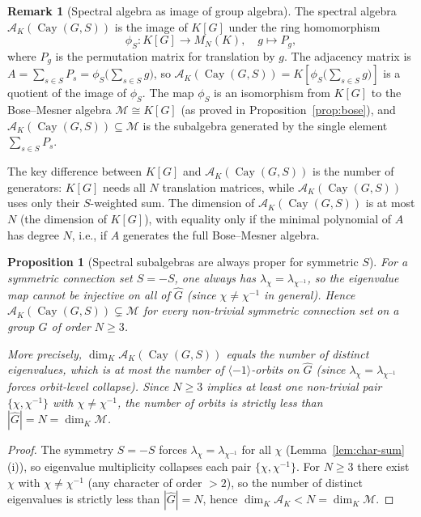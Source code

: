 \documentclass[12pt]{amsart}
\numberwithin{equation}{section}
\theoremstyle{plain}
\newtheorem{proposition}[theorem]{Proposition}
\theoremstyle{definition}
\newtheorem{remark}[theorem]{Remark}
\DeclareMathOperator{\Cay}{Cay}
\newcommand{\calA}{\mathcal{A}}
\newcommand{\Ghat}{\widehat{G}}
\begin{document}
\begin{remark}[Spectral algebra as image of group algebra]
The spectral algebra $\calA_K(\Cay(G,S))$ is the image
of $K[G]$ under the ring homomorphism
\[
  \phi_S : K[G] \to M_N(K), \quad g \mapsto P_g,
\]
where $P_g$ is the permutation matrix for translation by $g$.  The
adjacency matrix is $A = \sum_{s \in S} P_s = \phi_S\!\bigl(\sum_{s \in S} g\bigr)$,
so $\calA_K(\Cay(G,S)) = K\!\left[\phi_S\!\bigl(\sum_{s\in S} g\bigr)\right]$
is a quotient of the image of $\phi_S$.  The map $\phi_S$ is an
isomorphism from $K[G]$ to the Bose--Mesner algebra
$\mathcal{M} \cong K[G]$ (as proved in Proposition~\ref{prop:bose}),
and $\calA_K(\Cay(G,S)) \subseteq \mathcal{M}$ is the subalgebra
generated by the single element $\sum_{s \in S} P_s$.
\end{remark}

The key difference between $K[G]$ and $\calA_K(\Cay(G,S))$ is the
number of generators: $K[G]$ needs all $N$ translation matrices, while
$\calA_K(\Cay(G,S))$ uses only their $S$-weighted sum.  The dimension of
$\calA_K(\Cay(G,S))$ is at most $N$ (the dimension of $K[G]$), with
equality only if the minimal polynomial of $A$ has degree $N$, i.e., if
$A$ generates the full Bose--Mesner algebra.

\begin{proposition}[Spectral subalgebras are always proper for symmetric $S$]
\label{prop:full}
For a symmetric connection set $S = -S$, one always has
$\lambda_\chi = \lambda_{\chi^{-1}}$, so the eigenvalue map cannot be
injective on all of $\Ghat$ (since $\chi \ne \chi^{-1}$ in general).
Hence $\calA_K(\Cay(G,S)) \subsetneq \mathcal{M}$ for every non-trivial
symmetric connection set on a group $G$ of order $N \ge 3$.

More precisely, $\dim_K \calA_K(\Cay(G,S))$ equals the number of distinct
eigenvalues, which is at most the number of $\langle -1 \rangle$-orbits on
$\Ghat$ (since $\lambda_\chi = \lambda_{\chi^{-1}}$ forces orbit-level
collapse).  Since $N \ge 3$ implies at least one non-trivial pair
$\{\chi, \chi^{-1}\}$ with $\chi \ne \chi^{-1}$, the number of orbits
is strictly less than $|\Ghat| = N = \dim_K \mathcal{M}$.
\end{proposition}

\begin{proof}
The symmetry $S = -S$ forces $\lambda_\chi = \lambda_{\chi^{-1}}$ for
all $\chi$ (Lemma~\ref{lem:char-sum}(i)), so eigenvalue multiplicity
collapses each pair $\{\chi, \chi^{-1}\}$.  For $N \ge 3$ there exist
$\chi$ with $\chi \ne \chi^{-1}$ (any character of order $> 2$), so the
number of distinct eigenvalues is strictly less than $|\Ghat| = N$, hence
$\dim_K \calA_K < N = \dim_K \mathcal{M}$.
\end{proof}
\end{document}
